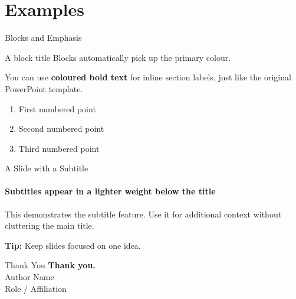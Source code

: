\documentclass[aspectratio=169, 11pt]{beamer}
\newcommand{\presentationauthor}{Author Name}
\newcommand{\presentationrole}{Role / Affiliation}
\begin{document}
\section{Examples}

\begin{frame}{Blocks and Emphasis}
  \begin{block}{A block title}
    Blocks automatically pick up the primary colour.
  \end{block}

  \vskip8pt
  You can use \textcolor{PrimaryColor}{\textbf{coloured bold text}} for
  inline section labels, just like the original PowerPoint template.

  \vskip8pt
  \begin{enumerate}
    \item First numbered point
    \item Second numbered point
    \item Third numbered point
  \end{enumerate}
\end{frame}

\begin{frame}{A Slide with a Subtitle}
  \framesubtitle{Subtitles appear in a lighter weight below the title}

  This demonstrates the subtitle feature. Use it for additional context
  without cluttering the main title.

  \vskip12pt
  \textcolor{PrimaryColor}{\textbf{Tip:}} Keep slides focused on one idea.
\end{frame}

\begin{frame}{Thank You}
  \centering
  \vskip1.5cm
  {\color{PrimaryColor}\Huge\bfseries Thank you.}\\[12pt]
  {\large \presentationauthor}\\[2pt]
  {\small\color{TextColor!60} \presentationrole}
\end{frame}
\end{document}
